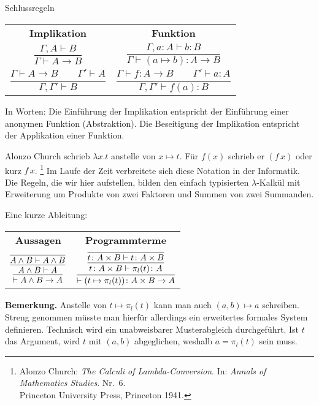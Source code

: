 \documentclass[8pt]{beamer}
\newcommand{\strong}[1]{\textsf{\textbf{#1}}}
\newcommand{\parspace}{\vspace{0.8em}}
\newcommand{\cond}{\rightarrow}
\begin{document}
\begin{frame}
\begin{block}{Schlussregeln}
\begin{center}
\begin{tabular}{c@{\qquad\qquad}c}
\strong{Implikation}
& \strong{Funktion}\\[10pt]
$\dfrac{\Gamma, A\vdash B}{\Gamma\vdash A\cond B}$
&
$\dfrac{\Gamma, a\colon A\vdash b\colon B}{\Gamma\vdash (a\mapsto b)\colon A\to B}$\\[18pt]
$\dfrac{\Gamma\vdash A\cond B\qquad\Gamma'\vdash A}{\Gamma,\Gamma'\vdash B}$
& $\dfrac{\Gamma\vdash f\colon A\to B\qquad\Gamma'\vdash a\colon A}{\Gamma,\Gamma'\vdash f(a)\colon B}$
\end{tabular}
\end{center}
\end{block}\pause

\parspace
In Worten: Die Einführung der Implikation entspricht der Einführung
einer anonymen Funktion (Abstraktion). Die Beseitigung der Implikation
entspricht der Applikation einer Funktion.\pause

\parspace
\begin{small}
Alonzo Church schrieb $\lambda x.t$ anstelle von $x\mapsto t$.
Für $f(x)$ schrieb er $(f\,x)$ oder kurz $f\,x$.%
\footnote{Alonzo Church: \emph{The Calculi of Lambda-Conversion}.
In: \emph{Annals of Mathematics Studies}. Nr.~6.\\
Princeton University Press, Princeton 1941.}
Im Laufe der Zeit verbreitete sich diese Notation in der Informatik.
Die Regeln, die wir hier aufstellen, bilden den einfach
typisierten $\lambda$-Kalkül mit Erweiterung um Produkte von zwei
Faktoren und Summen von zwei Summanden.
\end{small}
\end{frame}

\begin{frame}
Eine kurze Ableitung:

\vspace{1em}
\begin{center}
\begin{tabular}{c@{\qquad\qquad}c}
\strong{Aussagen} & \strong{Programmterme}\\[8pt]
$\infer{\vdash A\land B\cond A}{
  \infer{A\land B\vdash A}{
    \infer{A\land B\vdash A\land B}{}}}$
&
$\infer{\vdash (t\mapsto \pi_l(t))\colon A\times B\to A}{
  \infer{t\colon A\times B\vdash \pi_l(t)\colon A}{
    \infer{t\colon A\times B\vdash t\colon A\times B}{}}}$
\end{tabular}
\end{center}\pause

\parspace
\begin{footnotesize}
\strong{Bemerkung.}
Anstelle von $t\mapsto\pi_l(t)$ kann man auch $(a,b)\mapsto a$
schreiben. Streng genommen müsste man hierfür allerdings ein erweitertes
formales System definieren. Technisch wird ein unabweisbarer
Musterabgleich durchgeführt. Ist $t$ das Argument, wird $t$
mit $(a,b)$ abgeglichen, weshalb $a=\pi_l(t)$ sein muss.
\end{footnotesize}
\end{frame}
\end{document}
